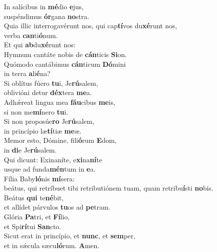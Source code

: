 \evenverse In salícibus in \textbf{mé}dio \textbf{e}jus,~\*\\
\evenverse suspéndimus \textbf{ór}gana \textbf{no}stra.\\
\oddverse Quia illic interrogavérunt nos, qui cap\textbf{tí}vos du\textbf{xé}runt nos,~\*\\
\oddverse verba \textbf{can}ti\textbf{ó}num.\\
\evenverse Et qui \textbf{ab}du\textbf{xé}runt nos:~\*\\
\evenverse Hymnum cantáte nobis de \textbf{cán}ticis \textbf{Si}on.\\
\oddverse Quómodo cantábimus \textbf{cán}ticum \textbf{Dó}mini~\*\\
\oddverse in terra \textbf{a}li\textbf{é}na?\\
\evenverse Si oblítus fúero \textbf{tu}i, Je\textbf{rú}salem,~\*\\
\evenverse oblivióni detur \textbf{déx}tera \textbf{me}a.\\
\oddverse Adhǽreat lingua mea \textbf{fáu}cibus \textbf{me}is,~\*\\
\oddverse si non me\textbf{mí}nero \textbf{tu}i.\\
\evenverse Si non proposúe\textbf{ro} Je\textbf{rú}salem,~\*\\
\evenverse in princípio læ\textbf{tí}tiæ \textbf{me}æ.\\
\oddverse Memor esto, Dómine, fili\textbf{ó}rum \textbf{E}dom,~\*\\
\oddverse in \textbf{di}e Je\textbf{rú}salem.\\
\evenverse Qui dicunt: Exinaníte, e\textbf{xi}na\textbf{ní}te~\*\\
\evenverse usque ad funda\textbf{mén}tum in \textbf{e}a.\\
\oddverse Fília Baby\textbf{ló}nis \textbf{mí}sera:~\*\\
\oddverse beátus, qui retríbuet tibi retributiónem tuam, quam retribu\textbf{í}sti \textbf{no}bis.\\
\evenverse Beátus \textbf{qui} te\textbf{né}bit,~\*\\
\evenverse et allídet párvulos \textbf{tu}os ad \textbf{pe}tram.\\
\oddverse Glória \textbf{Pa}tri, et \textbf{Fí}lio,~\*\\
\oddverse et Spi\textbf{rí}tui \textbf{San}cto.\\
\evenverse Sicut erat in princípio, et \textbf{nunc}, et \textbf{sem}per,~\*\\
\evenverse et in sǽcula sæcu\textbf{ló}rum. \textbf{A}men.\\

